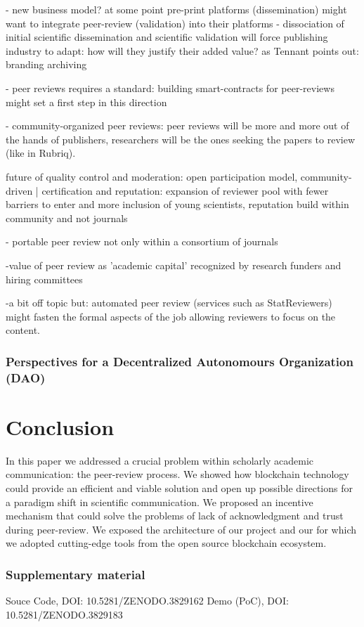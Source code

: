 \documentclass[runningheads]{llncs}
\begin{document}
- new business model? at some point pre-print platforms (dissemination) might want to integrate peer-review (validation) into their platforms - dissociation of initial scientific dissemination and scientific validation will force publishing industry to adapt: how will they justify their added value? as Tennant points out: branding archiving

- peer reviews requires a standard: building smart-contracts for peer-reviews might set a first step in this direction

- community-organized peer reviews: peer reviews will be more and more out of the hands of publishers, researchers will be the ones seeking the papers to review (like in Rubriq).

future of quality control and moderation: open participation model, community-driven | certification and reputation: expansion of reviewer pool with fewer barriers to enter and more inclusion of young scientists, reputation build within community and not journals

- portable peer review not only within a consortium of journals

-value of peer review as 'academic capital' recognized by research funders and hiring committees

-a bit off topic but: automated peer review (services such as StatReviewers) might fasten the formal aspects of the job allowing reviewers to focus on the content.

\subsubsection{Perspectives for a Decentralized Autonomours Organization (DAO)}

\section{Conclusion}
In this paper we addressed a crucial problem within scholarly academic communication: the peer-review process. We showed how blockchain technology could provide an efficient and viable solution and open up possible directions for a paradigm shift in scientific communication. We proposed an incentive mechanism that could solve the problems of lack of acknowledgment and trust during peer-review. We exposed the architecture of our project and our for which we adopted cutting-edge tools from the open source blockchain ecosystem.

\subsubsection{Supplementary material}
Souce Code, DOI: 10.5281/ZENODO.3829162
\newline Demo (PoC), DOI: 10.5281/ZENODO.3829183
\end{document}

